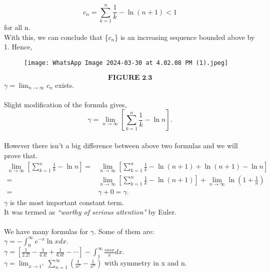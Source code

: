 \documentclass[a4paper,reqno,11pt]{book}
\theoremstyle{plain}%
\theoremstyle{definition}
\begin{document}
$$  c_{n} = \sum_{k=1}^{n} \frac{1}{k} - \ln(n+1) < 1$$ for all n.\\
With this, we can conclude that \{$c_{n}$\} is an increasing sequence bounded above by 1. Hence,
\begin{figure}
          \centering
        \texttt{[image: WhatsApp Image 2024-03-30 at 4.02.08 PM (1).jpeg]}
\end{figure}
$$\textbf{FIGURE 2.3}$$
$\gamma = \lim_{n\to\infty}c_{n}$ exists.\\
\\
Slight modification of the formula gives,\\
$$ \gamma = \lim_{n\to\infty}[\sum_{k=1}^{n} \frac{1}{k} - \ln n ].$$\\
However there isn't a big difference between above two formulas and we will prove that.
\begin{align*}
\lim_{n\to\infty}[\sum_{k=1}^{n} \frac{1}{k} - \ln n ]
=& \lim_{n\to\infty}[\sum_{k=1}^{n} \frac{1}{k} -\ln(n+1) + \ln(n+1) - \ln n ]\\
=& \lim_{n\to\infty}[\sum_{k=1}^{n} \frac{1}{k} -\ln(n+1)] + \lim_{n\to\infty}\ln(1+\frac{1}{n})\\
=& \gamma + 0 = \gamma. 
\end{align*}
$\gamma$ is the most important constant term. 
\\It was termed as \textit{``worthy of serious attention"} by Euler.\\
\\
We have many formulas for $\gamma$. Some of them are:\\
$\gamma = -\int_{0}^{\infty}e^{-x}\ln x  dx .$\\
$\gamma = [\frac{1}{2.2!} - \frac{1}{4.4!} + \frac{1}{6.6!} - \cdots] - \int_{1}^{\infty} \frac{cosx}{x} dx.$\\
$\gamma = \lim_{x\to1^+} \sum_{n=1}^{\infty} ( \frac{1}{n^x} - \frac{1}{x^n} ) $ with symmetry in x and n.\\
\\
\end{document}
